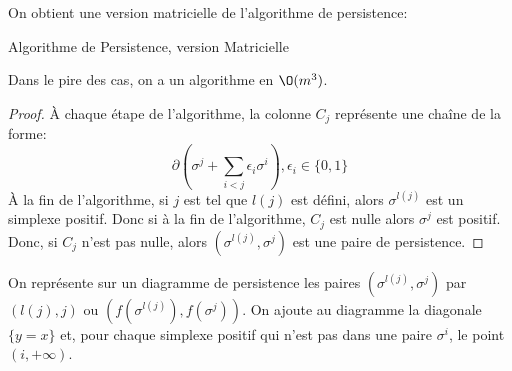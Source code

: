 On obtient une version matricielle de l'algorithme de persistence:
\begin{algorithm}
	\caption{Algorithme de Persistence, version Matricielle}
	\label{alg:persistence_mat}
	\begin{algorithmic}
		\EndInput
		\EndWhile
		\EndFor
	\end{algorithmic}
\end{algorithm}

Dans le pire des cas, on a un algorithme en $\O(m^{3})$.

\begin{proof}
	À chaque étape de l'algorithme, la colonne $C_{j}$ représente une chaîne de la forme:
	\begin{equation*}
		\partial \left(\sigma^{j} + \sum_{i < j} \epsilon_{i}\sigma^{i}\right), \epsilon_{i}\in \{0, 1\}
	\end{equation*}
	À la fin de l'algorithme, si $j$ est tel que $l(j)$ est défini, alors $\sigma^{l(j)}$ est un simplexe positif.
	Donc si à la fin de l'algorithme, $C_{j}$ est nulle alors $\sigma^{j}$ est positif.
	Donc, si $C_{j}$ n'est pas nulle, alors $(\sigma^{l(j)}, \sigma^{j})$ est une paire de persistence.
\end{proof}

\begin{definition}
	On représente sur un diagramme de persistence les paires $\left(\sigma^{l(j)}, \sigma^{j}\right)$ par $\left(l\left(j\right), j\right)$ ou $\left(f\left(\sigma^{l(j)}\right), f\left(\sigma^{j}\right)\right)$.
	On ajoute au diagramme la diagonale $\{y = x\}$ et, pour chaque simplexe positif qui n'est pas dans une paire $\sigma^{i}$, le point $(i, + \infty)$.
\end{definition}

